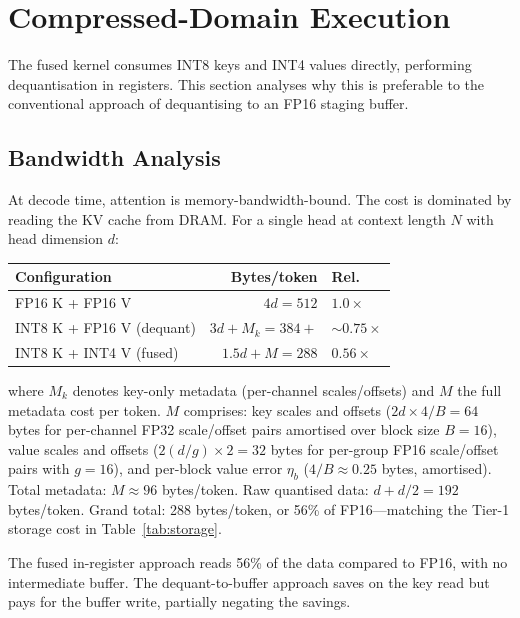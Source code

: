 \documentclass[10pt,twocolumn,a4paper]{article}
\theoremstyle{definition}
\theoremstyle{remark}
\begin{document}
\section{Compressed-Domain Execution}
\label{sec:compressed}

The fused kernel consumes INT8 keys and INT4 values directly, performing dequantisation in registers.  This section analyses why this is preferable to the conventional approach of dequantising to an FP16 staging buffer.

\subsection{Bandwidth Analysis}

At decode time, attention is memory-bandwidth-bound.  The cost is dominated by reading the KV cache from DRAM\@.  For a single head at context length $N$ with head dimension $d$:

\begin{center}
\footnotesize
\begin{tabular}{lrl}
\toprule
\textbf{Configuration} & \textbf{Bytes/token} & \textbf{Rel.} \\
\midrule
FP16 K + FP16 V & $4d = 512$ & $1.0\times$ \\
INT8 K + FP16 V (dequant) & $3d{+}M_k = 384{+}$ & ${\sim}0.75\times$ \\
INT8 K + INT4 V (fused) & $1.5d{+}M = 288$ & $0.56\times$ \\
\bottomrule
\end{tabular}
\end{center}

\noindent where $M_k$ denotes key-only metadata (per-channel scales/offsets) and $M$ the full metadata cost per token.  $M$ comprises: key scales and offsets ($2d \times 4/B = 64$ bytes for per-channel FP32 scale/offset pairs amortised over block size $B{=}16$), value scales and offsets ($2(d/g) \times 2 = 32$ bytes for per-group FP16 scale/offset pairs with $g{=}16$), and per-block value error $\eta_b$ ($4/B \approx 0.25$ bytes, amortised).  Total metadata: $M \approx 96$ bytes/token.  Raw quantised data: $d + d/2 = 192$ bytes/token.  Grand total: 288 bytes/token, or 56\% of FP16---matching the Tier-1 storage cost in Table~\ref{tab:storage}.

The fused in-register approach reads 56\% of the data compared to FP16, with no intermediate buffer.  The dequant-to-buffer approach saves on the key read but pays for the buffer write, partially negating the savings.
\end{document}
